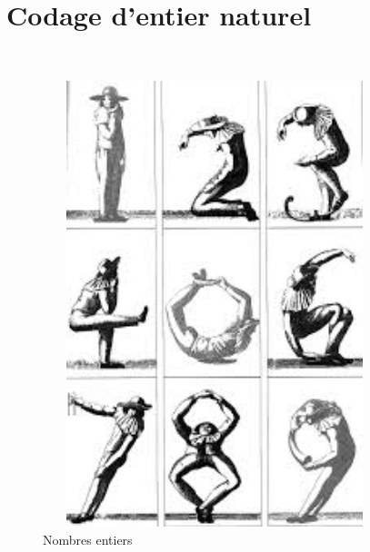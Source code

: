 \documentclass{article}
\begin{document}
\section{Codage d'entier naturel}
~\newline
\begin{center}
\begin{figure}[h]
\begin{center}
	\includegraphics[width=10cm,height=13cm]{illustration1.jpg}
	\caption[Illustration 1]{Nombres entiers}
	\label{ill1}
\end{center}
\end{figure}
\end{center}
\end{document}
